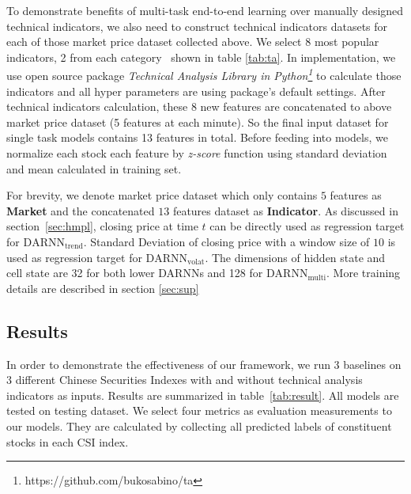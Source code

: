 \documentclass[sigconf,anonymous,review]{acmart}
\renewcommand{\cite}{\citep}
\begin{document}
To demonstrate benefits of multi-task end-to-end learning over
manually designed technical indicators, we also need to construct
technical indicators datasets for each of those market price
dataset collected above. We select 8 most popular indicators, 2
from each category~\cite{kirkpatrick2010technical} shown in table
\ref{tab:ta}. In implementation, we use open source package
\emph{Technical Analysis Library in
  Python\footnote{https://github.com/bukosabino/ta}} to calculate
those indicators and all hyper parameters are using package's
default settings. After technical indicators calculation, these 8
new features are concatenated to above market price dataset (5
features at each minute). So the final input dataset for single
task models contains 13 features in total. Before feeding into
models, we normalize each stock each feature by \emph{z-score}
function using standard deviation and mean calculated in training
set.

For brevity, we denote market price dataset which only contains 
$5$ features as
\textbf{Market} and the concatenated $13$ features dataset as
\textbf{Indicator}. As discussed in section~\ref{sec:hmpl}, 
closing price at time $t$ can be directly used as regression 
target for $\text{DARNN}_{\text{trend}}$. 
Standard Deviation of closing price with a window size of $10$ 
is used as regression target for $\text{DARNN}_{\text{volat}}$.
The dimensions of
hidden state and cell state are 32 for both lower DARNNs and
128 for $\text{DARNN}_{\text{multi}}$. More training details are
described in section \ref{sec:sup}

\subsection{Results}
\label{sec:res}

In order to demonstrate the effectiveness of our framework, we
run 3 baselines on 3 different Chinese Securities Indexes with
and without technical analysis indicators as inputs. Results are
summarized in table~\ref{tab:result}. All models are tested on
testing dataset. We select four metrics as evaluation
measurements to our models. They are calculated by collecting all
predicted labels of constituent stocks in each CSI index.
\end{document}

